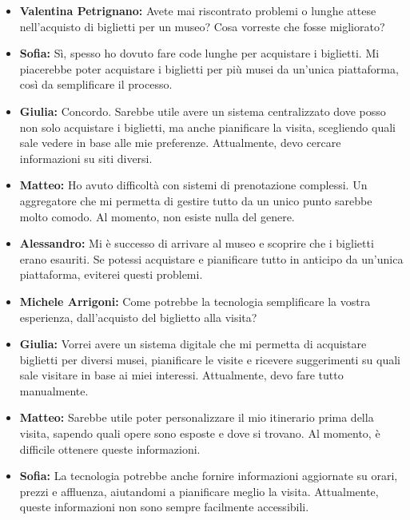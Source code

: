 \documentclass{article}
\begin{document}
\begin{itemize} 

\item \textbf{Valentina Petrignano:} Avete mai riscontrato problemi o lunghe attese nell’acquisto di biglietti per un museo? Cosa vorreste che fosse migliorato?

\item \textbf{Sofia:} Sì, spesso ho dovuto fare code lunghe per acquistare i biglietti. Mi piacerebbe poter acquistare i biglietti per più musei da un’unica piattaforma, così da semplificare il processo.

\item \textbf{Giulia:} Concordo. Sarebbe utile avere un sistema centralizzato dove posso non solo acquistare i biglietti, ma anche pianificare la visita, scegliendo quali sale vedere in base alle mie preferenze. Attualmente, devo cercare informazioni su siti diversi.

\item \textbf{Matteo:} Ho avuto difficoltà con sistemi di prenotazione complessi. Un aggregatore che mi permetta di gestire tutto da un unico punto sarebbe molto comodo. Al momento, non esiste nulla del genere.

\item \textbf{Alessandro:} Mi è successo di arrivare al museo e scoprire che i biglietti erano esauriti. Se potessi acquistare e pianificare tutto in anticipo da un’unica piattaforma, eviterei questi problemi.

\item \textbf{Michele Arrigoni:} Come potrebbe la tecnologia semplificare la vostra esperienza, dall’acquisto del biglietto alla visita?

\item \textbf{Giulia:} Vorrei avere un sistema digitale che mi permetta di acquistare biglietti per diversi musei, pianificare le visite e ricevere suggerimenti su quali sale visitare in base ai miei interessi. Attualmente, devo fare tutto manualmente.

\item \textbf{Matteo:} Sarebbe utile poter personalizzare il mio itinerario prima della visita, sapendo quali opere sono esposte e dove si trovano. Al momento, è difficile ottenere queste informazioni.

\item \textbf{Sofia:} La tecnologia potrebbe anche fornire informazioni aggiornate su orari, prezzi e affluenza, aiutandomi a pianificare meglio la visita. Attualmente, queste informazioni non sono sempre facilmente accessibili.


\end{itemize}
\end{document}
